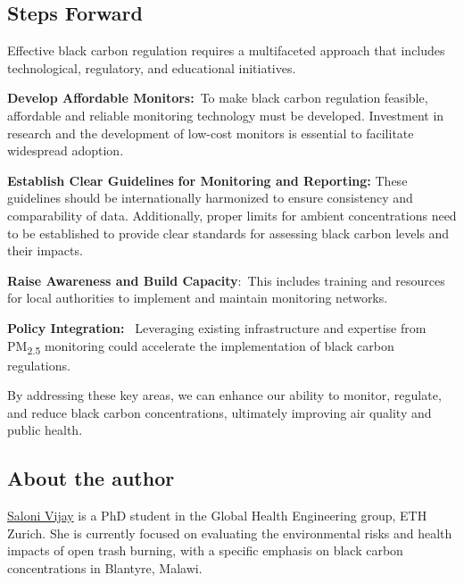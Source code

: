 \documentclass[
  letterpaper,
  DIV=11,
  numbers=noendperiod]{scrartcl}
\begin{document}
\begin{figure}
\begin{minipage}{0.61\linewidth}
\end{minipage}%

\end{figure}%

\subsection{Steps Forward}\label{steps-forward}

Effective black carbon regulation requires a multifaceted approach that
includes technological, regulatory, and educational initiatives.

\textbf{Develop Affordable Monitors:}~To make black carbon regulation
feasible, affordable and reliable monitoring technology must be
developed. Investment in research and the development of low-cost
monitors is essential to facilitate widespread adoption.

\textbf{Establish Clear Guidelines} \textbf{for Monitoring and
Reporting:} These guidelines should be internationally harmonized to
ensure consistency and comparability of data. Additionally, proper
limits for ambient concentrations need to be established to provide
clear standards for assessing black carbon levels and their impacts.

\textbf{Raise Awareness and Build Capacity}:~This includes training and
resources for local authorities to implement and maintain monitoring
networks.

\textbf{Policy Integration:}~ Leveraging existing infrastructure and
expertise from PM\textsubscript{2.5} monitoring could accelerate the
implementation of black carbon regulations.

By addressing these key areas, we can enhance our ability to monitor,
regulate, and reduce black carbon concentrations, ultimately improving
air quality and public health.

\subsection{About the author}\label{about-the-author}

\href{https://www.linkedin.com/in/saloni-vijay-9b9a51a7/}{Saloni Vijay}
is a PhD student in the Global Health Engineering group, ETH Zurich. She
is currently focused on evaluating the environmental risks and health
impacts of open trash burning, with a specific emphasis on black carbon
concentrations in Blantyre, Malawi.
\end{document}
